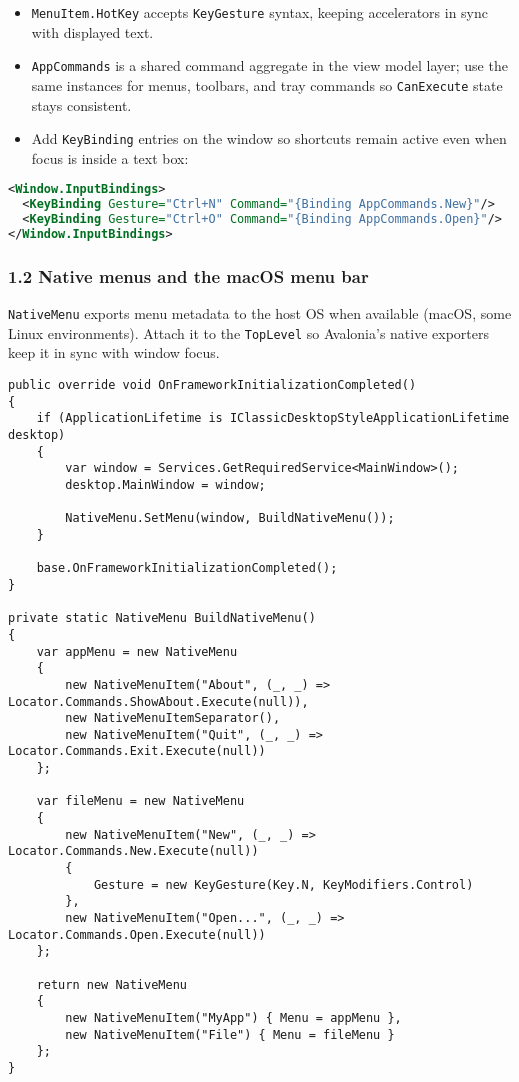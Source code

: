 \begin{itemize}
\tightlist
\item
  \passthrough{\lstinline!MenuItem.HotKey!} accepts
  \passthrough{\lstinline!KeyGesture!} syntax, keeping accelerators in
  sync with displayed text.
\item
  \passthrough{\lstinline!AppCommands!} is a shared command aggregate in
  the view model layer; use the same instances for menus, toolbars, and
  tray commands so \passthrough{\lstinline!CanExecute!} state stays
  consistent.
\item
  Add \passthrough{\lstinline!KeyBinding!} entries on the window so
  shortcuts remain active even when focus is inside a text box:
\end{itemize}

\begin{lstlisting}[language=XML]
<Window.InputBindings>
  <KeyBinding Gesture="Ctrl+N" Command="{Binding AppCommands.New}"/>
  <KeyBinding Gesture="Ctrl+O" Command="{Binding AppCommands.Open}"/>
</Window.InputBindings>
\end{lstlisting}

\subsubsection{1.2 Native menus and the macOS menu
bar}\label{native-menus-and-the-macos-menu-bar}

\passthrough{\lstinline!NativeMenu!} exports menu metadata to the host
OS when available (macOS, some Linux environments). Attach it to the
\passthrough{\lstinline!TopLevel!} so Avalonia's native exporters keep
it in sync with window focus.

\begin{lstlisting}
public override void OnFrameworkInitializationCompleted()
{
    if (ApplicationLifetime is IClassicDesktopStyleApplicationLifetime desktop)
    {
        var window = Services.GetRequiredService<MainWindow>();
        desktop.MainWindow = window;

        NativeMenu.SetMenu(window, BuildNativeMenu());
    }

    base.OnFrameworkInitializationCompleted();
}

private static NativeMenu BuildNativeMenu()
{
    var appMenu = new NativeMenu
    {
        new NativeMenuItem("About", (_, _) => Locator.Commands.ShowAbout.Execute(null)),
        new NativeMenuItemSeparator(),
        new NativeMenuItem("Quit", (_, _) => Locator.Commands.Exit.Execute(null))
    };

    var fileMenu = new NativeMenu
    {
        new NativeMenuItem("New", (_, _) => Locator.Commands.New.Execute(null))
        {
            Gesture = new KeyGesture(Key.N, KeyModifiers.Control)
        },
        new NativeMenuItem("Open...", (_, _) => Locator.Commands.Open.Execute(null))
    };

    return new NativeMenu
    {
        new NativeMenuItem("MyApp") { Menu = appMenu },
        new NativeMenuItem("File") { Menu = fileMenu }
    };
}
\end{lstlisting}

